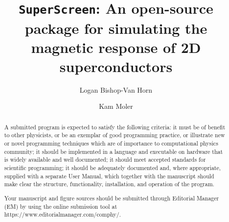 \documentclass[preprint,12pt]{elsarticle}
\begin{document}
\begin{frontmatter}



\title{\texttt{SuperScreen}: An open-source package for simulating the magnetic response of 2D superconductors}


\author[a]{Logan Bishop-Van Horn}
\author[a,b]{Kam Moler}

\address[a]{First Address}
\address[b]{Second Address}

\begin{abstract}
A submitted program is expected to satisfy the following criteria: it must be of benefit to other physicists, or be an exemplar of good programming practice, or illustrate new or novel programming techniques which are of importance to computational physics community; it should be implemented in a language and executable on hardware that is widely available and well documented; it should meet accepted standards for scientific programming; it should be adequately documented and, where appropriate, supplied with a separate User Manual, which together with the manuscript should make clear the structure, functionality, installation, and operation of the program.

Your manuscript and figure sources should be submitted through Editorial Manager (EM) by using the online submission tool at \\
https://www.editorialmanager.com/comphy/.


\end{abstract}
\end{frontmatter}
\end{document}
